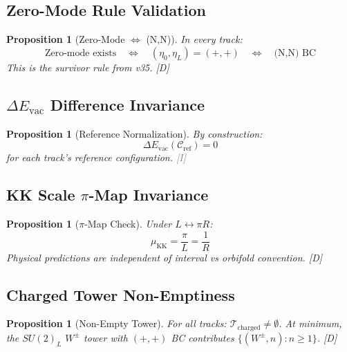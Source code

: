 \documentclass[11pt,a4paper]{article}
\newtheorem{proposition}[theorem]{Proposition}
\newcommand{\tagD}{\textcolor{blue!70!black}{[D]}}
\newcommand{\tagI}{\textcolor{gray}{[I]}}
\begin{document}
\subsection{Zero-Mode Rule Validation}

\begin{proposition}[Zero-Mode $\Leftrightarrow$ (N,N)]
\label{prop:zero-rule}
In every track:
\begin{equation}
\label{eq:zero-rule}
\text{Zero-mode exists} \quad \Leftrightarrow \quad (\eta_0, \eta_L) = (+,+) \quad \Leftrightarrow \quad \text{(N,N) BC}
\end{equation}
This is the survivor rule from v35. \tagD
\end{proposition}

\subsection{$\Delta E_{\text{vac}}$ Difference Invariance}

\begin{proposition}[Reference Normalization]
\label{prop:ref-check}
By construction:
\begin{equation}
\label{eq:ref-check}
\Delta E_{\text{vac}}(\mathcal{C}_{\text{ref}}) = 0
\end{equation}
for each track's reference configuration. \tagI
\end{proposition}

\subsection{KK Scale $\pi$-Map Invariance}

\begin{proposition}[$\pi$-Map Check]
\label{prop:pi-check}
Under $L \leftrightarrow \pi R$:
\begin{equation}
\label{eq:pi-check}
\mu_{\text{KK}} = \frac{\pi}{L} = \frac{1}{R}
\end{equation}
Physical predictions are independent of interval vs orbifold convention. \tagD
\end{proposition}

\subsection{Charged Tower Non-Emptiness}

\begin{proposition}[Non-Empty Tower]
\label{prop:nonempty}
For all tracks: $\mathcal{T}_{\text{charged}} \neq \emptyset$.
At minimum, the $SU(2)_L$ $W^\pm$ tower with $(+,+)$ BC contributes
$\{(W^\pm, n) : n \geq 1\}$. \tagD
\end{proposition}
\end{document}
